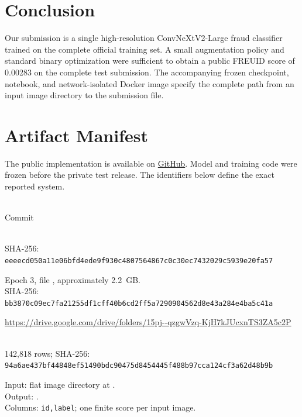 \documentclass[10pt,twocolumn]{article}
\begin{document}
\section{Conclusion}
Our submission is a single high-resolution ConvNeXtV2-Large fraud classifier
trained on the complete official training set. A small augmentation policy and
standard binary optimization were sufficient to obtain a public FREUID score of
0.00283 on the complete test submission. The accompanying frozen checkpoint,
notebook, and network-isolated
Docker image specify the complete path from an input image directory to the
submission file.

\section{Artifact Manifest}
The public implementation is available on
\href{https://github.com/hanifnoerr/freuid-2026-reproducibility}{GitHub}. Model
and training code were frozen before the private test release. The identifiers
below define the exact reported system.

\begin{description}[style=nextline,font=\normalfont\bfseries]
\item[Code freeze]
\\
Commit 

\item[Model identifier]

\item[Training notebook]
\\
SHA-256:
\nolinkurl{eeeecd050a11e06bfd4ede9f930c4807564867c0c30ec7432029c5939e20fa57}

\item[Selected checkpoint]
Epoch 3, file , approximately 2.2~GB.\\
SHA-256:
\nolinkurl{bb3870c09ec7fa21255df1cff40b6cd2ff5a7290904562d8e43a284e4ba5c41a}

\item[Checkpoint storage]
\url{https://drive.google.com/drive/folders/15pj--qzgwVzq-KjH7kJUcxnTS3ZA5c2P}

\item[Reported submission]
\\
142,818 rows; SHA-256:\\
\nolinkurl{94a6ae437bf44848ef51490bdc90475d8454445f488b97cca124cf3a62d48b9b}

\item[Container contract]
Input: flat image directory at .\\
Output: .\\
Columns: \texttt{id,label}; one finite score per input image.
\end{description}

\begingroup
\raggedright


\endgroup
\end{document}
